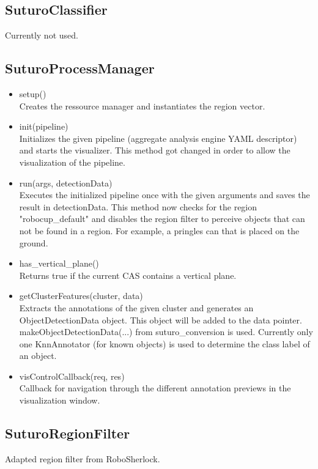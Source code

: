 \documentclass[main.tex]{subfiles}
\begin{document}
\subsection{SuturoClassifier}
Currently not used.

\subsection{SuturoProcessManager}
\begin{itemize}
\item setup()\\
Creates the ressource manager and instantiates the region vector.

\item init(pipeline)\\
Initializes the given pipeline (aggregate analysis engine YAML descriptor) and starts the visualizer.
This method got changed in order to allow the visualization of the pipeline.

\item run(args, detectionData)\\
Executes the initialized pipeline once with the given arguments and saves the result in detectionData.
This method now checks for the region "robocup\_default" and disables the region filter to perceive objects that can not be found
in a region. For example, a pringles can that is placed on the ground.

\item has\_vertical\_plane()\\
Returns true if the current CAS contains a vertical plane.

\item getClusterFeatures(cluster, data)\\
Extracts the annotations of the given cluster and generates an ObjectDetectionData object. 
This object will be added to the data pointer. makeObjectDetectionData(...) from suturo\_conversion is used.
Currently only one KnnAnnotator (for known objects) is used to determine the class label of an object.

\item visControlCallback(req, res)\\
Callback for navigation through the different annotation previews in the visualization window.
\end{itemize}

\subsection{SuturoRegionFilter}
Adapted region filter from RoboSherlock.
\end{document}
